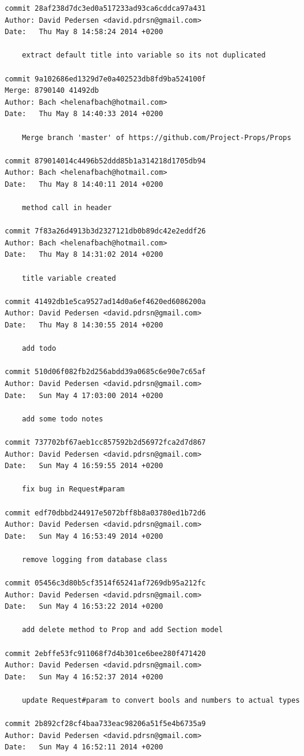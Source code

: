\documentclass[12pt]{article}
\begin{document}
\begin{verbatim}
commit 28af238d7dc3ed0a517233ad93ca6cddca97a431
Author: David Pedersen <david.pdrsn@gmail.com>
Date:   Thu May 8 14:58:24 2014 +0200

    extract default title into variable so its not duplicated

commit 9a102686ed1329d7e0a402523db8fd9ba524100f
Merge: 8790140 41492db
Author: Bach <helenafbach@hotmail.com>
Date:   Thu May 8 14:40:33 2014 +0200

    Merge branch 'master' of https://github.com/Project-Props/Props

commit 879014014c4496b52ddd85b1a314218d1705db94
Author: Bach <helenafbach@hotmail.com>
Date:   Thu May 8 14:40:11 2014 +0200

    method call in header

commit 7f83a26d4913b3d2327121db0b89dc42e2eddf26
Author: Bach <helenafbach@hotmail.com>
Date:   Thu May 8 14:31:02 2014 +0200

    title variable created

commit 41492db1e5ca9527ad14d0a6ef4620ed6086200a
Author: David Pedersen <david.pdrsn@gmail.com>
Date:   Thu May 8 14:30:55 2014 +0200

    add todo

commit 510d06f082fb2d256abdd39a0685c6e90e7c65af
Author: David Pedersen <david.pdrsn@gmail.com>
Date:   Sun May 4 17:03:00 2014 +0200

    add some todo notes

commit 737702bf67aeb1cc857592b2d56972fca2d7d867
Author: David Pedersen <david.pdrsn@gmail.com>
Date:   Sun May 4 16:59:55 2014 +0200

    fix bug in Request#param

commit edf70dbbd244917e5072bff8b8a03780ed1b72d6
Author: David Pedersen <david.pdrsn@gmail.com>
Date:   Sun May 4 16:53:49 2014 +0200

    remove logging from database class

commit 05456c3d80b5cf3514f65241af7269db95a212fc
Author: David Pedersen <david.pdrsn@gmail.com>
Date:   Sun May 4 16:53:22 2014 +0200

    add delete method to Prop and add Section model

commit 2ebffe53fc911068f7d4b301ce6bee280f471420
Author: David Pedersen <david.pdrsn@gmail.com>
Date:   Sun May 4 16:52:37 2014 +0200

    update Request#param to convert bools and numbers to actual types

commit 2b892cf28cf4baa733eac98206a51f5e4b6735a9
Author: David Pedersen <david.pdrsn@gmail.com>
Date:   Sun May 4 16:52:11 2014 +0200


\end{verbatim}
\end{document}
